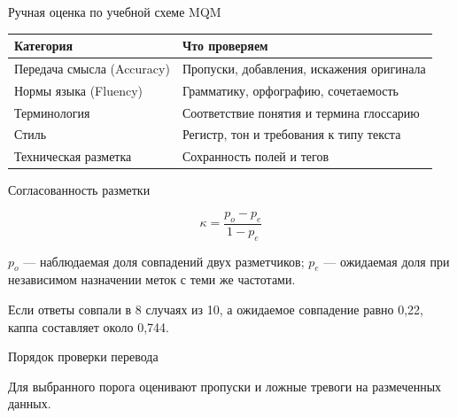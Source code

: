 \documentclass[aspectratio=169,12pt]{beamer}
\begin{document}
\begin{frame}{Ручная оценка по учебной схеме MQM}
\color{ink}
{\small\renewcommand{\arraystretch}{1.15}\begin{tabular}{@{}Л{0.38} Л{0.54}@{}}\toprule
Категория & Что проверяем\\\midrule
Передача смысла (Accuracy) & Пропуски, добавления, искажения оригинала\\[0.15em]
Нормы языка (Fluency) & Грамматику, орфографию, сочетаемость\\[0.15em]
Терминология & Соответствие понятия и термина глоссарию\\[0.15em]
Стиль & Регистр, тон и требования к типу текста\\[0.15em]
Техническая разметка & Сохранность полей и тегов\\[0.15em]\bottomrule\end{tabular}}
\end{frame}

\begin{frame}{Согласованность разметки}
\color{ink}
{\small \[\displaystyle \kappa=\frac{p_o-p_e}{1-p_e}\]
\par\vspace{0.6em}$p_o$ — наблюдаемая доля совпадений двух разметчиков; $p_e$ — ожидаемая доля при независимом назначении меток с теми же частотами.
\par\vspace{0.6em}Если ответы совпали в 8 случаях из 10, а ожидаемое совпадение равно 0,22, каппа составляет около 0,744.}
\end{frame}

\begin{frame}{Порядок проверки перевода}
\color{ink}
\begin{center}\end{center}{\small Для выбранного порога оценивают пропуски и ложные тревоги на размеченных данных.}
\end{frame}
\end{document}
